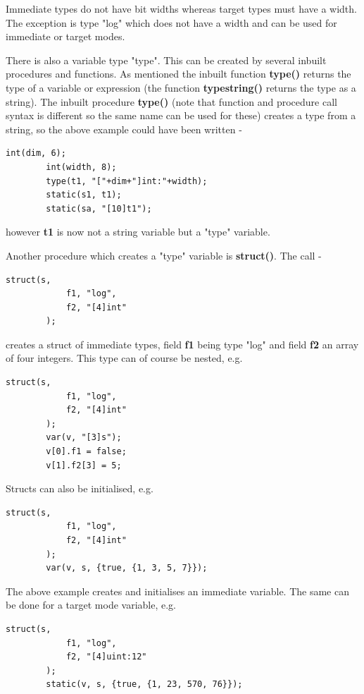 \documentclass[10pt,a4paper,twoside,fleqn]{article}
\newcommand{\kwd}[1]{{\bf #1}} %
\newcommand{\var}[1]{{\bf #1}} %
\begin{document}
    Immediate types do not have bit widths whereas target types must have a
    width. The exception is type "log" which does not have a width and can be
    used for immediate or target modes.
    
    There is also a variable type "type". This can be created by several
    inbuilt procedures and functions. As mentioned the inbuilt function
    \kwd{type()} returns the type of a variable or expression (the function
    \kwd{typestring()} returns the type as a string). The inbuilt
    procedure
    \kwd{type()} (note that function and procedure call syntax is different so
    the same name can be used for these) creates a type from a string, so the
    above example could have been written -
    \begin{lstlisting}[language=threepl]
        int(dim, 6);
        int(width, 8);
        type(t1, "["+dim+"]int:"+width);
        static(s1, t1);
        static(sa, "[10]t1");
    \end{lstlisting}
    however \var{t1} is now not a string variable but a "type" variable.
    
    Another procedure which creates a "type" variable is \kwd{struct()}.
    The call -
    \begin{lstlisting}[language=threepl]
        struct(s,
            f1, "log",
            f2, "[4]int"
        );
    \end{lstlisting}
    creates a struct of immediate types, field \var{f1} being type "log"
    and field \var{f2} an array of four integers. This type can of course be
    nested, e.g.
    \begin{lstlisting}[language=threepl]
        struct(s,
            f1, "log",
            f2, "[4]int"
        );
        var(v, "[3]s");
        v[0].f1 = false;
        v[1].f2[3] = 5;
    \end{lstlisting}
    Structs can also be initialised, e.g.
    \begin{lstlisting}[language=threepl]
        struct(s,
            f1, "log",
            f2, "[4]int"
        );
        var(v, s, {true, {1, 3, 5, 7}});
    \end{lstlisting}
    
    The above example creates and initialises an immediate variable. The same
    can be done for a target mode variable, e.g.
    \begin{lstlisting}[language=threepl]
        struct(s,
            f1, "log",
            f2, "[4]uint:12"
        );
        static(v, s, {true, {1, 23, 570, 76}});
    \end{lstlisting}
    
\end{document}
